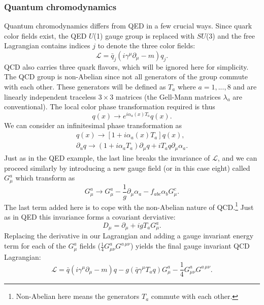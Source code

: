 \subsubsection{Quantum chromodynamics}
Quantum chromodynamics differs from QED in a few crucial ways. Since quark color fields exist, the QED $U$(1) gauge group is replaced with $SU$(3) and the free Lagrangian contains indices $j$ to denote the three color fields: 
\begin{equation}
\mathcal{L} = \bar{q}_j(i\gamma^\mu\partial_\mu - m)q_j.
\end{equation}
QCD also carries three quark flavors, which will be ignored here for simplicity. The QCD group is non-Abelian since not all generators of the group commute with each other. These generators will be defined as $T_a$ where $a=1,...,8$ and are linearly independent traceless $3\times3$ matrices (the Gell-Mann matrices $\lambda_a$ are conventional). The local color phase transformation required is thus 
\begin{equation}
q(x) \rightarrow e^{i\alpha_a(x)T_a}q(x).
\end{equation}
We can consider an infinitesimal phase transformation as 
\begin{equation}
\begin{split}
q(x) \rightarrow [1+i\alpha_a(x)T_a]q(x), \\ 
\partial_uq \rightarrow (1+i\alpha_aT_a)\partial_\mu q + i T_a q \partial_\mu \alpha_a.
\end{split}
\end{equation}
Just as in the QED example, the last line breaks the invariance of $\mathcal{L}$, and we can proceed similarly by introducing a new gauge field (or in this case eight) called $G_\mu^a$ which transform as
\begin{equation}
G_\mu^a \rightarrow G_\mu^a - \frac{1}{g}\partial_\mu\alpha_a - f_{abc}\alpha_b G_\mu^c.
\end{equation}
The last term added here is to cope with the non-Abelian nature of QCD.\footnote{Non-Abelian here means the generators $T_a$ commute with each other.} Just as in QED this invariance forms a covariant derviative:
\begin{equation}
D_\mu = \partial_\mu + i g T_aG_\mu^a.
\end{equation}
Replacing the derivative in our Lagrangian and adding a gauge invariant energy term for each of the $G_\mu^a$ fields ($\frac{1}{4}G_{\mu\nu}^a G^{a \, \mu\nu}$) yields the final gauge invariant QCD Lagrangian:
\begin{equation}
\mathcal{L} = \bar{q}(i\gamma^\mu\partial_\mu - m)q - g(\bar{q}\gamma^\mu T_aq)G_\mu^a-\frac{1}{4}G_{\mu\nu}^aG^{a \, \mu\nu}.
\end{equation}

